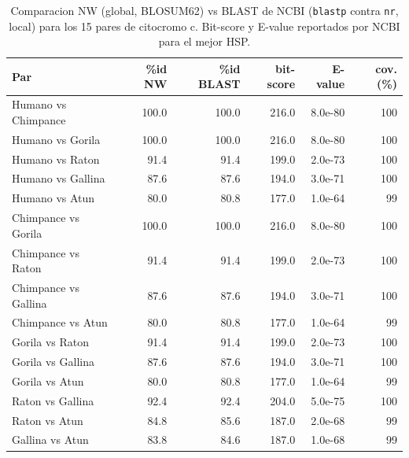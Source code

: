 \begin{table}[h]
\centering
\small
\caption{Comparacion NW (global, BLOSUM62) vs BLAST de NCBI (\texttt{blastp} contra \texttt{nr}, local) para los 15 pares de citocromo c. Bit-score y E-value reportados por NCBI para el mejor HSP.}
\begin{tabular}{lrrrrr}
\toprule
Par & \%id NW & \%id BLAST & bit-score & E-value & cov. (\%) \\
\midrule
Humano vs Chimpance & 100.0 & 100.0 & 216.0 & 8.0e-80 & 100 \\
Humano vs Gorila & 100.0 & 100.0 & 216.0 & 8.0e-80 & 100 \\
Humano vs Raton & 91.4 & 91.4 & 199.0 & 2.0e-73 & 100 \\
Humano vs Gallina & 87.6 & 87.6 & 194.0 & 3.0e-71 & 100 \\
Humano vs Atun & 80.0 & 80.8 & 177.0 & 1.0e-64 & 99 \\
Chimpance vs Gorila & 100.0 & 100.0 & 216.0 & 8.0e-80 & 100 \\
Chimpance vs Raton & 91.4 & 91.4 & 199.0 & 2.0e-73 & 100 \\
Chimpance vs Gallina & 87.6 & 87.6 & 194.0 & 3.0e-71 & 100 \\
Chimpance vs Atun & 80.0 & 80.8 & 177.0 & 1.0e-64 & 99 \\
Gorila vs Raton & 91.4 & 91.4 & 199.0 & 2.0e-73 & 100 \\
Gorila vs Gallina & 87.6 & 87.6 & 194.0 & 3.0e-71 & 100 \\
Gorila vs Atun & 80.0 & 80.8 & 177.0 & 1.0e-64 & 99 \\
Raton vs Gallina & 92.4 & 92.4 & 204.0 & 5.0e-75 & 100 \\
Raton vs Atun & 84.8 & 85.6 & 187.0 & 2.0e-68 & 99 \\
Gallina vs Atun & 83.8 & 84.6 & 187.0 & 1.0e-68 & 99 \\
\bottomrule
\end{tabular}
\end{table}